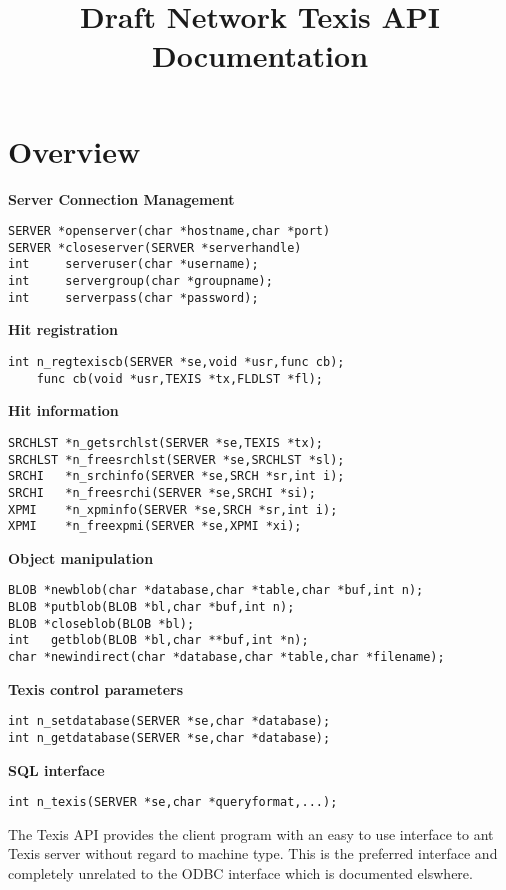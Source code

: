 
\title{Draft Network Texis API Documentation}
\tableofcontents
\chapter{Overview}
\SYNOPSIS
{\bf Server Connection Management }
\begin{verbatim}
SERVER *openserver(char *hostname,char *port)
SERVER *closeserver(SERVER *serverhandle)
int     serveruser(char *username);
int     servergroup(char *groupname);
int     serverpass(char *password);
\end{verbatim}

{\bf Hit registration }
\begin{verbatim}
int n_regtexiscb(SERVER *se,void *usr,func cb);
    func cb(void *usr,TEXIS *tx,FLDLST *fl);
\end{verbatim}

{\bf Hit information }
\begin{verbatim}
SRCHLST *n_getsrchlst(SERVER *se,TEXIS *tx);
SRCHLST *n_freesrchlst(SERVER *se,SRCHLST *sl);
SRCHI   *n_srchinfo(SERVER *se,SRCH *sr,int i);
SRCHI   *n_freesrchi(SERVER *se,SRCHI *si);
XPMI    *n_xpminfo(SERVER *se,SRCH *sr,int i);
XPMI    *n_freexpmi(SERVER *se,XPMI *xi);
\end{verbatim}

{\bf Object manipulation }
\begin{verbatim}
BLOB *newblob(char *database,char *table,char *buf,int n);
BLOB *putblob(BLOB *bl,char *buf,int n);
BLOB *closeblob(BLOB *bl);
int   getblob(BLOB *bl,char **buf,int *n);
char *newindirect(char *database,char *table,char *filename);
\end{verbatim}

{\bf Texis control parameters }
\begin{verbatim}
int n_setdatabase(SERVER *se,char *database);
int n_getdatabase(SERVER *se,char *database);
\end{verbatim}

{\bf SQL interface }
\begin{verbatim}
int n_texis(SERVER *se,char *queryformat,...);
\end{verbatim}

\DESCRIPTION
The Texis API provides the client program with an easy to use interface to
ant Texis server without regard to machine type.  This is the preferred
interface and completely unrelated to the ODBC interface which is
documented elswhere.

